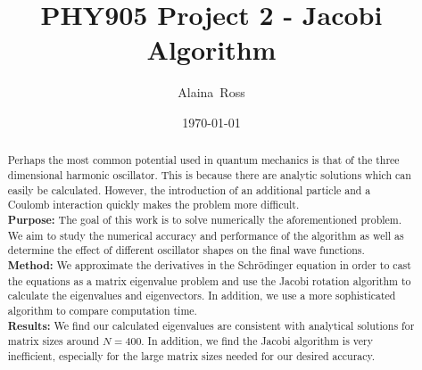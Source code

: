 \documentclass[prc,amsmath,twocolumn,superscriptaddress]{revtex4}
\begin{document}
  \newcommand {\nc} {\newcommand}
  \nc {\Sec} [1] {Sec.~\ref{#1}}
  \nc {\IR} [1] {\textcolor{red}{#1}} 

\title{PHY905 Project 2 - Jacobi Algorithm}


\author{Alaina~Ross}

\date{\today}


\begin{abstract}
  Perhaps the most common potential used in quantum mechanics is that of the three dimensional harmonic oscillator. This is because there are analytic solutions which can easily be calculated. However, the introduction of an additional particle and a Coulomb interaction quickly makes the problem more difficult.
\\ {\bf Purpose:} The goal of this work is to solve numerically the aforementioned problem. We aim to study the numerical accuracy and performance of the algorithm as well as determine the effect of different oscillator shapes on the final wave functions.
\\ {\bf Method:} We approximate the derivatives in the Schr{\"o}dinger equation in order to cast the equations as a matrix eigenvalue problem and use the Jacobi rotation algorithm to calculate the eigenvalues and eigenvectors. In addition, we use a more sophisticated algorithm to compare computation time.
\\ {\bf Results:} We find our calculated eigenvalues are consistent with analytical solutions for matrix sizes around $N=400$. In addition, we find the Jacobi algorithm is very inefficient, especially for the large matrix sizes needed for our desired accuracy.

\end{abstract}
\end{document}
